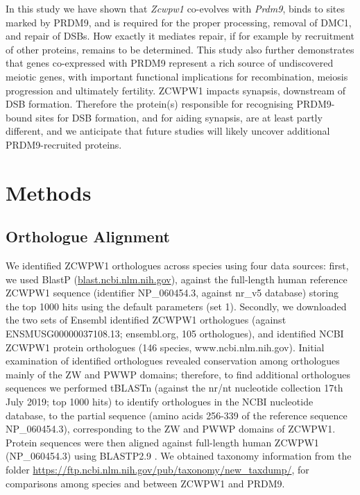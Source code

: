 In this study we have shown that \textit{Zcwpw1} co-evolves with \textit{Prdm9}, binds to sites marked by PRDM9, and is required for the proper processing, removal of DMC1, and repair of DSBs. How exactly it mediates repair, if for example by recruitment of other proteins, remains to be determined. This study also further demonstrates that genes co-expressed with PRDM9 represent a rich source of undiscovered meiotic genes, with important functional implications for recombination, meiosis progression and ultimately fertility. ZCWPW1 impacts synapsis, downstream of DSB formation. Therefore the protein(s) responsible for recognising PRDM9-bound sites for DSB formation, and for aiding synapsis, are at least partly different, and we anticipate that future studies will likely uncover additional PRDM9-recruited proteins.

\section{Methods}
\subsection{Orthologue Alignment}
\label{sec:orthologues}
We identified ZCWPW1 orthologues across species using four data sources: first, we used BlastP (\url{blast.ncbi.nlm.nih.gov}), against the full-length human reference ZCWPW1 sequence (identifier NP\_060454.3, against nr\_v5 database) storing the top 1000 hits using the default parameters (set 1). Secondly, we downloaded the two sets of Ensembl identified ZCWPW1 orthologues (against ENSMUSG00000037108.13; ensembl.org, 105 orthologues), and identified NCBI ZCWPW1 protein orthologues (146 species, www.ncbi.nlm.nih.gov). Initial examination of identified orthologues revealed conservation among orthologues mainly of the ZW and PWWP domains; therefore, to find additional orthologues sequences we performed tBLASTn (against the nr/nt nucleotide collection 17th July 2019; top 1000 hits) to identify orthologues in the NCBI nucleotide database, to the partial sequence (amino acids 256-339 of the reference sequence NP\_060454.3), corresponding to the ZW and PWWP domains of ZCWPW1. Protein sequences were then aligned against full-length human ZCWPW1 (NP\_060454.3) using BLASTP2.9 \parencite{Altschul1997Gapped,Altschul2005Protein}. We obtained taxonomy information from the folder \url{https://ftp.ncbi.nlm.nih.gov/pub/taxonomy/new_taxdump/}, for comparisons among species and between ZCWPW1 and PRDM9.

